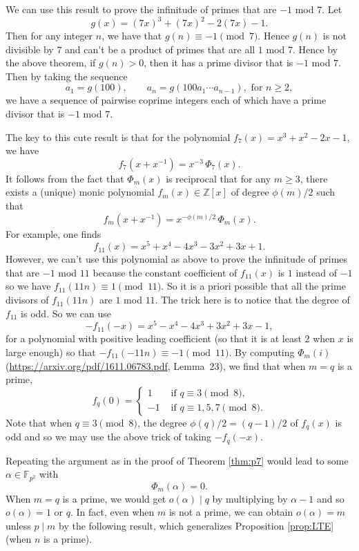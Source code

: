 \documentclass{article}
\def\Z{{\mathbb Z}}
\def\F{{\mathbb F}}
\def\Z{{\mathbb Z}}
\def\F{{\mathbb F}}
\begin{document}
We can use this result to prove the infinitude of primes that are $-1$ mod $7$. Let $$g(x) = (7x)^3 + (7x)^2 - 2(7x) - 1.$$ Then for any integer $n$, we have that $g(n)\equiv -1\pmod{7}.$ Hence $g(n)$ is not divisible by $7$ and can't be a product of primes that are all $1$ mod $7$. Hence by the above theorem, if $g(n)>0$, then it has a prime divisor that is $-1$ mod $7$. Then by taking the sequence $$a_1 = g(100),\qquad a_n = g(100a_1\cdots a_{n-1}),\mbox{ for }n\geq 2,$$
we have a sequence of pairwise coprime integers each of which have a prime divisor that is $-1$ mod $7$.

The key to this cute result is that for the polynomial $f_7(x) = x^3 + x^2 - 2x - 1$, we have
$$f_7(x + x^{-1}) = x^{-3}\,\Phi_7(x).$$
It follows from the fact that $\Phi_m(x)$ is reciprocal that for any $m\geq 3$, there exists a (unique) monic polynomial $f_m(x)\in\Z[x]$ of degree $\phi(m)/2$ such that
$$f_m(x + x^{-1}) = x^{-\phi(m)/2}\,\Phi_m(x).$$
For example, one finds
$$f_{11}(x) = x^5 + x^4 - 4x^3 - 3x^2 + 3x + 1.$$
However, we can't use this polynomial as above to prove the infinitude of primes that are $-1$ mod $11$ because the constant coefficient of $f_{11}(x)$ is $1$ instead of $-1$ so we have $f_{11}(11n)\equiv 1\pmod{11}$. So it is a priori possible that all the prime divisors of $f_{11}(11n)$ are $1$ mod $11$. The trick here is to notice that the degree of $f_{11}$ is odd. So we can use
$$-f_{11}(-x) = x^5 - x^4 - 4x^3 + 3x^2 + 3x - 1,$$
for a polynomial with positive leading coefficient (so that it is at least $2$ when $x$ is large enough) so that $-f_{11}(-11n)\equiv -1\pmod{11}$. By computing $\Phi_m(i)$ (\url{https://arxiv.org/pdf/1611.06783.pdf}, Lemma~23), we find that when $m = q$ is a prime,
$$f_q(0) = \begin{cases}
    1&\mbox{ if }q\equiv 3\pmod{8},\\
    -1&\mbox{ if }q\equiv 1,5,7\pmod{8}.
\end{cases}$$
Note that when $q\equiv 3\pmod{8}$, the degree $\phi(q)/2 = (q-1)/2$ of $f_q(x)$ is odd and so we may use the above trick of taking $-f_q(-x)$. 

Repeating the argument as in the proof of Theorem \ref{thm:p7} would lead to some $\alpha\in\F_{p^2}$ with $$\Phi_m(\alpha) = 0.$$
When $m = q$ is a prime, we would get $o(\alpha) \mid q$ by multiplying by $\alpha - 1$ and so $o(\alpha) = 1$ or $q$. In fact, even when $m$ is not a prime, we can obtain $o(\alpha) = m$ unless $p\mid m$ by the following result, which generalizes Proposition \ref{prop:LTE} (when $n$ is a prime).
\end{document}
